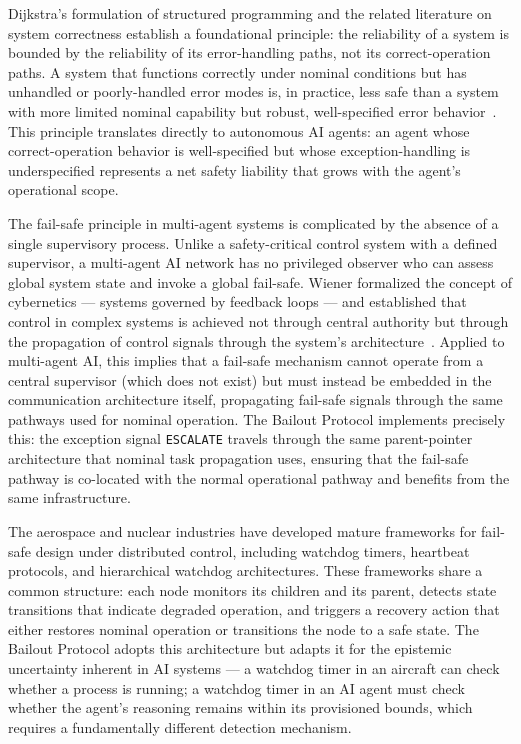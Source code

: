 Dijkstra's formulation of structured programming and the related literature on system correctness establish a foundational principle: the reliability of a system is bounded by the reliability of its error-handling paths, not its correct-operation paths. A system that functions correctly under nominal conditions but has unhandled or poorly-handled error modes is, in practice, less safe than a system with more limited nominal capability but robust, well-specified error behavior~\cite{dijkstra1982}. This principle translates directly to autonomous AI agents: an agent whose correct-operation behavior is well-specified but whose exception-handling is underspecified represents a net safety liability that grows with the agent's operational scope.

The fail-safe principle in multi-agent systems is complicated by the absence of a single supervisory process. Unlike a safety-critical control system with a defined supervisor, a multi-agent AI network has no privileged observer who can assess global system state and invoke a global fail-safe. Wiener formalized the concept of cybernetics — systems governed by feedback loops — and established that control in complex systems is achieved not through central authority but through the propagation of control signals through the system's architecture~\cite{wiener1948}. Applied to multi-agent AI, this implies that a fail-safe mechanism cannot operate from a central supervisor (which does not exist) but must instead be embedded in the communication architecture itself, propagating fail-safe signals through the same pathways used for nominal operation. The Bailout Protocol implements precisely this: the exception signal \texttt{ESCALATE} travels through the same parent-pointer architecture that nominal task propagation uses, ensuring that the fail-safe pathway is co-located with the normal operational pathway and benefits from the same infrastructure.

The aerospace and nuclear industries have developed mature frameworks for fail-safe design under distributed control, including watchdog timers, heartbeat protocols, and hierarchical watchdog architectures. These frameworks share a common structure: each node monitors its children and its parent, detects state transitions that indicate degraded operation, and triggers a recovery action that either restores nominal operation or transitions the node to a safe state. The Bailout Protocol adopts this architecture but adapts it for the epistemic uncertainty inherent in AI systems — a watchdog timer in an aircraft can check whether a process is running; a watchdog timer in an AI agent must check whether the agent's reasoning remains within its provisioned bounds, which requires a fundamentally different detection mechanism.

